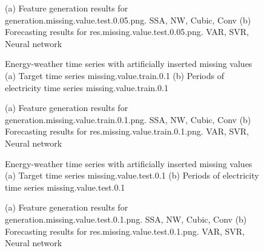 \documentclass[12pt]{article}
\begin{document}
\begin{figure}
\centering
{}
\caption{(a)	Feature generation results for	generation.missing.value.test.0.05.png.	SSA, NW, Cubic, Conv	(b)	Forecasting results for	res.missing.value.test.0.05.png.	VAR, SVR, Neural network	}
\end{figure}


\begin{figure}
\centering
{}
\caption{Energy-weather time series with artificially inserted missing values	(a) Target time series	missing.value.train.0.1	(b) Periods of electricity time series	missing.value.train.0.1	}
\end{figure}


\begin{figure}
\centering
{}
\caption{(a)	Feature generation results for	generation.missing.value.train.0.1.png.	SSA, NW, Cubic, Conv	(b)	Forecasting results for	res.missing.value.train.0.1.png.	VAR, SVR, Neural network	}
\end{figure}


\begin{figure}
\centering
{}
\caption{Energy-weather time series with artificially inserted missing values	(a) Target time series	missing.value.test.0.1	(b) Periods of electricity time series	missing.value.test.0.1	}
\end{figure}


\begin{figure}
\centering
{}
\caption{(a)	Feature generation results for	generation.missing.value.test.0.1.png.	SSA, NW, Cubic, Conv	(b)	Forecasting results for	res.missing.value.test.0.1.png.	VAR, SVR, Neural network	}
\end{figure}
\end{document}
